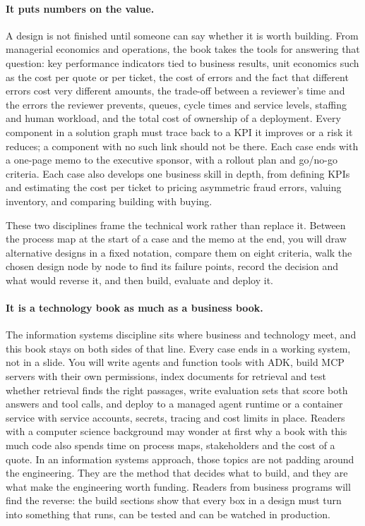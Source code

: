 \paragraph{It puts numbers on the value.} A design is not finished until someone can say whether it is worth building. From managerial economics and operations, the book takes the tools for answering that question: key performance indicators tied to business results, unit economics such as the cost per quote or per ticket, the cost of errors and the fact that different errors cost very different amounts, the trade-off between a reviewer's time and the errors the reviewer prevents, queues, cycle times and service levels, staffing and human workload, and the total cost of ownership of a deployment. Every component in a solution graph must trace back to a KPI it improves or a risk it reduces; a component with no such link should not be there. Each case ends with a one-page memo to the executive sponsor, with a rollout plan and go/no-go criteria. Each case also develops one business skill in depth, from defining KPIs and estimating the cost per ticket to pricing asymmetric fraud errors, valuing inventory, and comparing building with buying.

These two disciplines frame the technical work rather than replace it. Between the process map at the start of a case and the memo at the end, you will draw alternative designs in a fixed notation, compare them on eight criteria, walk the chosen design node by node to find its failure points, record the decision and what would reverse it, and then build, evaluate and deploy it.

\paragraph{It is a technology book as much as a business book.} The information systems discipline sits where business and technology meet, and this book stays on both sides of that line. Every case ends in a working system, not in a slide. You will write agents and function tools with ADK, build MCP servers with their own permissions, index documents for retrieval and test whether retrieval finds the right passages, write evaluation sets that score both answers and tool calls, and deploy to a managed agent runtime or a container service with service accounts, secrets, tracing and cost limits in place. Readers with a computer science background may wonder at first why a book with this much code also spends time on process maps, stakeholders and the cost of a quote. In an information systems approach, those topics are not padding around the engineering. They are the method that decides what to build, and they are what make the engineering worth funding. Readers from business programs will find the reverse: the build sections show that every box in a design must turn into something that runs, can be tested and can be watched in production.

